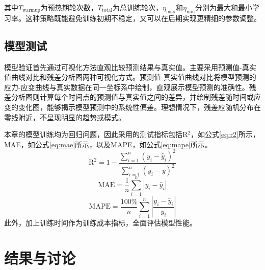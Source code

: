 其中$T_{\text{warmup}}$为预热期轮次数，$T_{\text{total}}$为总训练轮次，$\eta_{\text{max}}$和$\eta_{\text{min}}$分别为最大和最小学习率。这种策略既能避免训练初期不稳定，又可以在后期实现更精细的参数调整。


\subsection{模型测试} \label{sec:metrics}
模型验证首先通过可视化方法直观比较预测结果与真实值。主要采用预测值-真实值曲线对比和残差分析图两种可视化方式。预测值-真实值曲线对比将模型预测的应力-应变曲线与真实数据在同一坐标系中绘制，直观展示模型预测的准确性。残差分析图则计算每个时间点的预测值与真实值之间的差异，并绘制残差随时间或应变的变化图，能够揭示模型预测中的系统性偏差。理想情况下，残差应随机分布在零线附近，不呈现明显的趋势或模式。

本章的模型训练均为回归问题，因此采用的测试指标包括R$^2$，如公式\eqref{eq:r2}所示，MAE，如公式\eqref{eq:mae}所示，以及MAPE，如公式\eqref{eq:mape}所示。
\begin{equation}
  \text{R}^2 = 1 - \frac{\sum_{i=1}^{n} (y_i - \hat{y}_i)^2}{\sum_{i=1}^{n} (y_i - \bar{y})^2} \label{eq:r2}
\end{equation}
\begin{equation}
  \text{MAE} = \frac{1}{n} \sum_{i=1}^{n} |y_i - \hat{y}_i| \label{eq:mae}
\end{equation}
\begin{equation}
  \text{MAPE} = \frac{100\%}{n} \sum_{i=1}^{n} \left| \frac{y_i - \hat{y}_i}{y_i} \right| \label{eq:mape}
\end{equation}
此外，加上训练时间作为训练成本指标，全面评估模型性能。


\section{结果与讨论}
